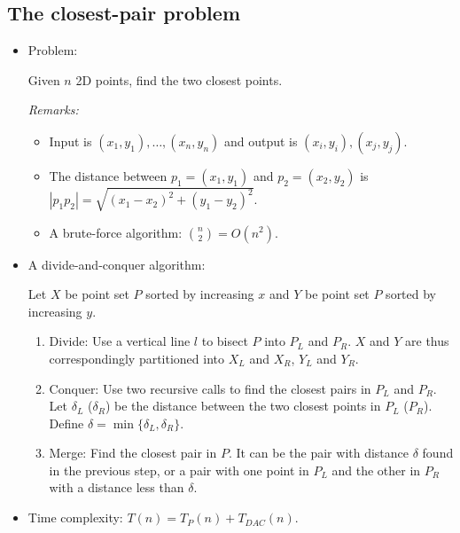 \documentclass{article}
\begin{document}
\subsection{The closest-pair problem}


\begin{itemize}

\item Problem:

Given $n$ 2D points, find the two closest points.

{\em Remarks:}
\begin{itemize}
\item Input is $(x_1,y_1),\ldots,(x_n,y_n)$ and output is
$(x_i,y_i),(x_j,y_j)$.
\item The distance between $p_1=(x_1,y_1)$ and $p_2=(x_2,y_2)$ is
$|p_1p_2|=\sqrt{(x_1-x_2)^2+(y_1-y_2)^2}$.
\item A brute-force algorithm: ${n\choose2}=O(n^2)$.
\end{itemize}

\item  A divide-and-conquer algorithm:

Let $X$ be point set $P$ sorted by increasing $x$ and
$Y$ be point set $P$ sorted by increasing $y$.

\begin{enumerate}

\item Divide: Use a vertical line $l$ to bisect $P$ into $P_L$ and $P_R$.
$X$ and $Y$ are thus correspondingly partitioned into $X_L$ and $X_R$,
$Y_L$ and $Y_R$.

\item Conquer: Use two recursive calls to find the closest pairs in
$P_L$ and $P_R$. Let $\delta_L$ ($\delta_R$) be the distance between the
two closest points in $P_L$ ($P_R$). Define $\delta=\min\{\delta_L,
\delta_R\}$.

\item Merge: Find the closest pair in $P$. It can be the pair
with distance $\delta$ found in the previous step, or a pair
with one point in $P_L$ and the other in $P_R$ with a distance
less than $\delta$.

\end{enumerate}

\item Time complexity: $T(n)=T_P(n)+T_{DAC}(n)$.


\end{itemize}
\end{document}
